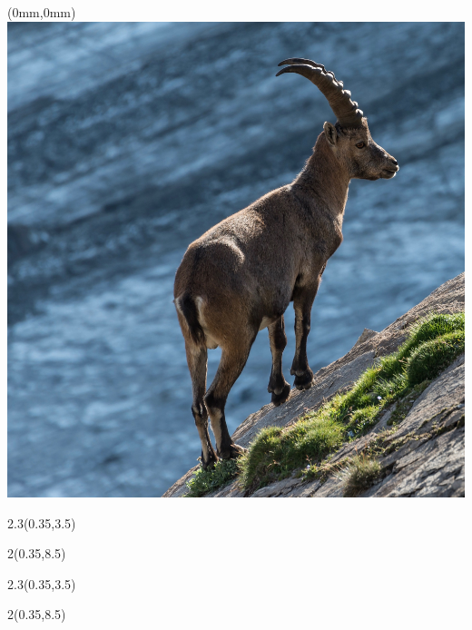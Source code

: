 \begin{textblock*}{\paperwidth}(0mm,0mm)
  \includegraphics[width=\paperwidth,%
                   keepaspectratio=true]{Steinbock}
\end{textblock*}

\begin{textblock*}{2.3\TPHorizModule}(0.35\TPHorizModule,3.5\TPVertModule)
  \textcolor{white}{\titlefmt}
\end{textblock*}

\begin{textblock*}{2\TPHorizModule}(0.35\TPHorizModule,8.5\TPVertModule)
  \textcolor{white}{\authorfmt}
\end{textblock*}

\null\cleardoublepage


\begin{textblock*}{2.3\TPHorizModule}(0.35\TPHorizModule,3.5\TPVertModule)
  \titlefmt
\end{textblock*}

\begin{textblock*}{2\TPHorizModule}(0.35\TPHorizModule,8.5\TPVertModule)
  \authorfmt
\end{textblock*}

